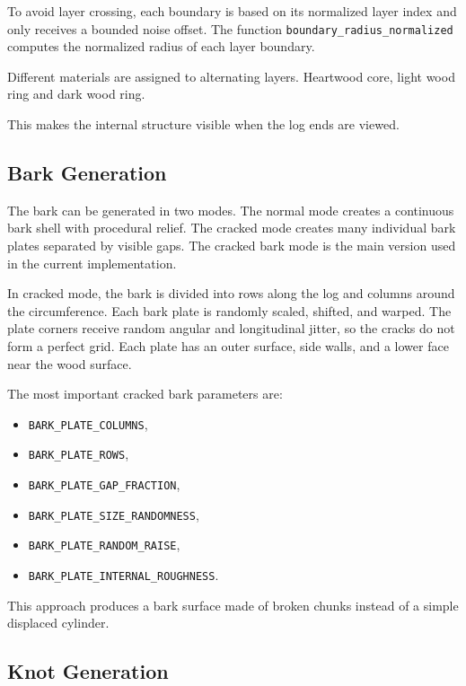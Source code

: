 \documentclass{egpubl}
\begin{document}
To avoid layer crossing, each boundary is based on its normalized layer index and only receives a bounded noise offset. The function \texttt{boundary\_radius\_normalized} computes the normalized radius of each layer boundary.

Different materials are assigned to alternating layers. Heartwood core, light wood ring and dark wood ring.

This makes the internal structure visible when the log ends are viewed.


\subsection{Bark Generation}

The bark can be generated in two modes. The normal mode creates a continuous bark shell with procedural relief. The cracked mode creates many individual bark plates separated by visible gaps. The cracked bark mode is the main version used in the current implementation.

In cracked mode, the bark is divided into rows along the log and columns around the circumference. Each bark plate is randomly scaled, shifted, and warped. The plate corners receive random angular and longitudinal jitter, so the cracks do not form a perfect grid. Each plate has an outer surface, side walls, and a lower face near the wood surface.

The most important cracked bark parameters are:

\begin{itemize}
    \item \texttt{BARK\_PLATE\_COLUMNS},
    \item \texttt{BARK\_PLATE\_ROWS},
    \item \texttt{BARK\_PLATE\_GAP\_FRACTION},
    \item \texttt{BARK\_PLATE\_SIZE\_RANDOMNESS},
    \item \texttt{BARK\_PLATE\_RANDOM\_RAISE},
    \item \texttt{BARK\_PLATE\_INTERNAL\_ROUGHNESS}.
\end{itemize}

This approach produces a bark surface made of broken chunks instead of a simple displaced cylinder.


\subsection{Knot Generation}
\end{document}
